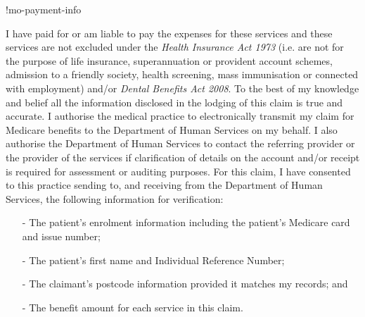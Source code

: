 \documentclass[12pt]{article}
\begin{document}
\begin{spacing}{0.3}

\vspace{1mm}
  
  {\footnotesize

    !mo-payment-info} 

 \vspace{3mm}

{\tiny
 
I have paid for or am liable to pay the expenses for these services and these services are not excluded under the \emph{Health Insurance Act 1973} (i.e. are not for the purpose of life insurance, superannuation or provident account schemes, admission to a friendly society, health screening, mass immunisation or connected with employment) and/or \emph{Dental Benefits Act 2008}. To the best of my knowledge and belief all the information disclosed in the lodging of this claim is true and accurate. I authorise the medical practice to electronically transmit my claim for Medicare benefits to the Department of Human Services on my behalf. I also authorise the Department of Human Services to contact the referring provider or the provider of the services if clarification of details on the account and/or receipt is required for assessment or auditing purposes. 
For this claim, I have consented to this practice sending to, and receiving from the Department of Human Services, the following information for verification:

\vspace{1mm}

\begin{itemize}[noitemsep,nolistsep]
  \item[-] The patient’s enrolment information including the patient’s Medicare card and issue number; 
  \item[-] The patient’s first name and Individual Reference Number; 
  \item[-] The claimant’s postcode information provided it matches my records; and 
  \item[-] The benefit amount for each service in this claim.
\end{itemize}

\vspace{1mm}

}
\end{spacing}
\end{document}
